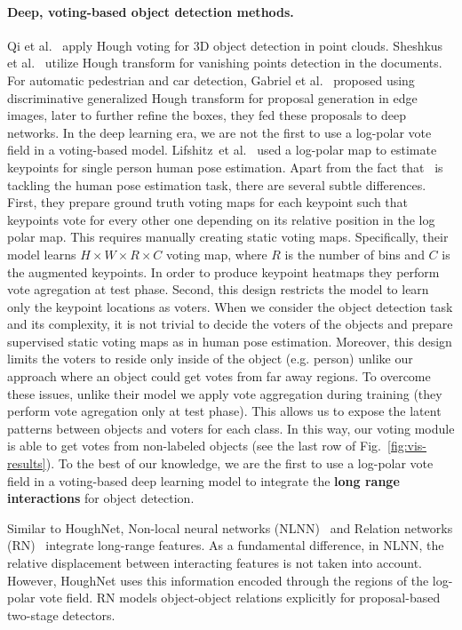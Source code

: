 \documentclass[runningheads]{llncs}
\newcommand{\etal}{et al.}
\begin{document}
\paragraph{\textbf{Deep, voting-based object detection methods.}}   Qi \etal~\cite{3dhough} apply Hough voting for 3D object detection in point clouds. Sheshkus \etal~\cite{otherhoughnet}  utilize Hough transform for vanishing points detection in the documents.  For automatic pedestrian and car detection, Gabriel \etal~\cite{hough_proposal} proposed using discriminative generalized Hough transform for proposal generation in edge images, later to further refine the boxes, they fed these proposals to deep networks.  In the deep learning era, we are not the first to use a log-polar vote field in a voting-based model. Lifshitz~\etal~\cite{consensus} used a log-polar map to estimate keypoints for single person human pose estimation. Apart from the fact that~\cite{consensus} is tackling the human pose estimation task, there are several subtle differences. First, they prepare ground truth voting maps for each keypoint such that keypoints vote for every other one depending on its relative position in the log polar map. This requires manually creating static voting maps. Specifically, their model learns $H\times W\times R\times C$ voting map, where $R$ is the number of bins and $C$ is the augmented keypoints. In order to produce keypoint heatmaps they perform vote agregation at test phase. Second, this design restricts the model to learn only the keypoint locations as voters. When we consider the object detection task and its complexity, it is not trivial to decide the voters of the objects and prepare supervised static voting maps as in human pose estimation. Moreover, this design limits the voters to reside only inside of the object (e.g. person) unlike our approach where an object could get votes from far away regions. To overcome these issues, unlike their model we apply vote aggregation during training (they perform vote agregation only at test phase). This allows us to expose the latent patterns between objects and voters for each class. In this way, our voting module is able to get votes from non-labeled objects  (see the last row of Fig.~\ref{fig:vis-results}). To the best of our knowledge, we are the first to use a log-polar vote field in a voting-based deep learning  model to integrate the \textbf{long range interactions} for object detection.


Similar to HoughNet, Non-local neural networks (NLNN)~\cite{nlnn} and Relation networks (RN)~\cite{relation_networks} integrate long-range features.  As a fundamental difference, in NLNN, the relative displacement between interacting features is not taken into account. However, HoughNet uses this information encoded through the regions of the log-polar vote field. RN models object-object relations explicitly for proposal-based two-stage detectors. 
\end{document}
